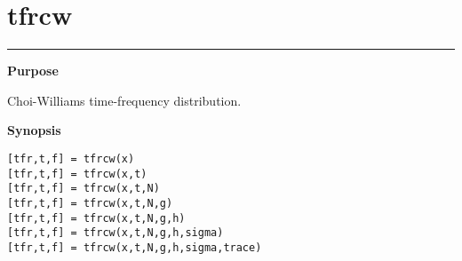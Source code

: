 

\section*{\hspace*{-1.6cm} tfrcw}

\vspace*{-.4cm}
\hspace*{-1.6cm}\rule[0in]{16.5cm}{.02cm}
\vspace*{.2cm}

{\bf \large \sf Purpose}\\
\hspace*{1.5cm}
\begin{minipage}[t]{13.5cm}
Choi-Williams time-frequency distribution.
\end{minipage}
\vspace*{.5cm}

{\bf \large \sf Synopsis}\\
\hspace*{1.5cm}
\begin{minipage}[t]{13.5cm}
\begin{verbatim}
[tfr,t,f] = tfrcw(x)
[tfr,t,f] = tfrcw(x,t)
[tfr,t,f] = tfrcw(x,t,N)
[tfr,t,f] = tfrcw(x,t,N,g)
[tfr,t,f] = tfrcw(x,t,N,g,h)
[tfr,t,f] = tfrcw(x,t,N,g,h,sigma)
[tfr,t,f] = tfrcw(x,t,N,g,h,sigma,trace)
\end{verbatim}
\end{minipage}
\vspace*{.5cm}

